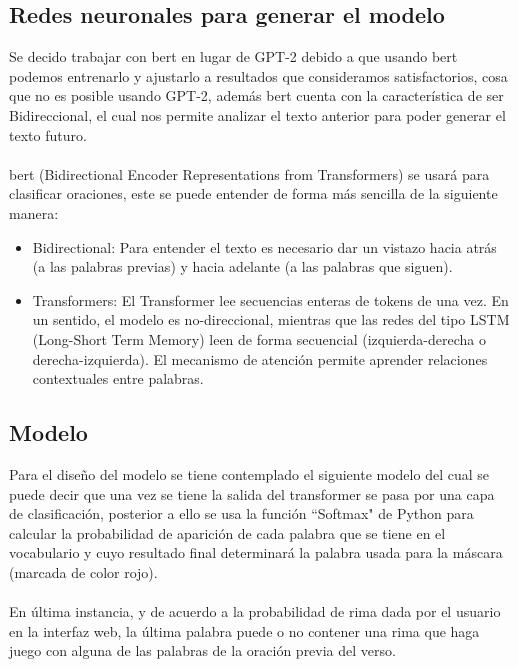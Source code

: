 \documentclass[12pt, a4paper, titlepage]{report}
\begin{document}
		\subsection{Redes neuronales para generar el modelo} %
		Se decido trabajar con \acrshort{bert} en lugar de GPT-2 debido a que usando \acrshort{bert} podemos entrenarlo y ajustarlo a resultados que consideramos satisfactorios, cosa que no es posible usando GPT-2, además \acrshort{bert} cuenta con la característica de ser Bidireccional, el cual nos permite analizar el texto anterior para poder generar el texto futuro.\\\\
		\acrshort{bert} (Bidirectional Encoder Representations from Transformers) se usará para clasificar oraciones, este se puede entender de forma más sencilla de la siguiente manera:
		\begin{itemize}
			\item Bidirectional: Para entender el texto es necesario dar un vistazo hacia atrás (a las palabras previas) y hacia adelante (a las palabras que siguen).
			\item Transformers: El Transformer lee secuencias enteras de tokens de una vez. En un sentido, el modelo es no-direccional, mientras que las redes del tipo LSTM (Long-Short Term Memory) leen de forma secuencial (izquierda-derecha o derecha-izquierda). El mecanismo de atención permite aprender relaciones contextuales entre palabras.
		\end{itemize}
		
		\subsection{Modelo} %
		
		Para el diseño del modelo se tiene contemplado el siguiente modelo del cual se puede decir que una vez se tiene la salida del transformer se pasa por una capa de clasificación, posterior a ello se usa la función “Softmax" de Python para calcular la probabilidad de aparición de cada palabra que se tiene en el vocabulario y cuyo resultado final determinará la palabra usada para la máscara (marcada de color rojo).
		\\\\
		En última instancia, y de acuerdo a la probabilidad de rima dada por el usuario en la interfaz web, la última palabra puede o no contener una rima que haga juego con alguna de las palabras de la oración previa del verso.
		
\end{document}
